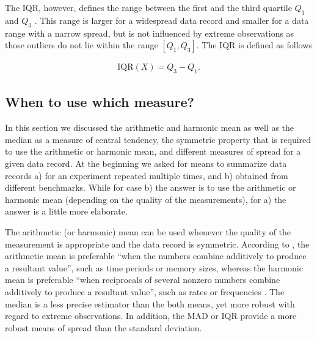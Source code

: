 The IQR, however, defines the range between the first and the third quartile
$Q_1$ and $Q_3$ \citep{shanmugam_statistics_2015}. This range is larger for a
widespread data record and smaller for a data range with a narrow spread, but is not influenced by extreme
observations as those outliers do not lie within the range $\left[ Q_1,Q_3
\right] $. The IQR is defined as follows

\begin{equation} \label{eq:iqr}
\begin{split}
\mathrm{IQR}(X) = Q_3 - Q_1.
\end{split}
\end{equation}

\subsection{When to use which measure?}
In this section we discussed the arithmetic and harmonic mean as well as the
median as a measure of central tendency, the symmetric property that is
required to use the arithmetic or harmonic mean, and different measures of
spread for a given data record. At the beginning we asked for means to
summarize data records a) for an experiment repeated multiple times, and b)
obtained from different benchmarks. While for case b) the answer is to use the
arithmetic or harmonic mean (depending on the quality of the measurements), for
a) the answer is a little more elaborate.

The arithmetic (or harmonic) mean can be used whenever the quality of the
measurement is appropriate and the data record is symmetric. According to
\cite{shanmugam_statistics_2015}, the arithmetic mean is preferable ``when the numbers combine
additively to produce a resultant value'', such as time periods or memory sizes, whereas
the harmonic mean is preferable ``when reciprocals of several nonzero numbers
combine additively to produce a resultant value'', such as rates or frequencies
\citep{smith_characterizing_1988}.
The median is a less precise estimator than the both means, yet more robust
with regard to extreme observations. In addition, the MAD or IQR provide a more
robust means of spread than the standard deviation.

